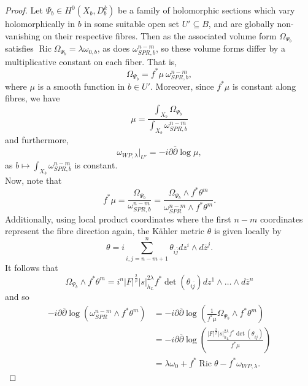 \documentclass[12pt]{article}
\numberwithin{equation}{section}
\renewcommand{\d}{\partial}
\newcommand{\dbar}{\overline{\partial}}
\DeclareMathOperator{\Ric}{Ric}
\newcommand{\oo}[1]{\overline{#1}}
\begin{document}
\begin{proof}
Let $\Psi_b \in H^0(X_b,D_b^k)$ be a family of holomorphic sections which vary holomorphically in $b$ in some suitable open set $U' \subseteq B$, and are globally non-vanishing on their respective fibres. Then as the associated volume form $\Omega_{\Psi_b}$ satisfies $\Ric \Omega_{\Psi_b} = \lambda \omega_{0,b}$, as does $\omega_{SPR,b}^{n-m}$, so these volume forms differ by a multiplicative constant on each fiber. That is, 
\begin{equation*}
    \Omega_{\Psi_b} = f^*\mu \ \omega_{SPR,b}^{n-m},
\end{equation*}
where $\mu$ is a smooth function in $b \in U'$. Moreover, since $f^*\mu$ is constant along fibres, we have 
\begin{equation*}
    \mu= \frac{\int_{X_b} \Omega_{\Psi_b}}{\int_{X_b}\omega_{SPR,b}^{n-m}}
\end{equation*}
and furthermore,
\begin{equation*}
    \omega_{WP,\lambda}|_{U'} = -i\d\dbar \log \mu,
\end{equation*}
as $b \mapsto \int_{X_b} \omega_{SPR,b}^{n-m}$ is constant.\\ 
Now, note that
\begin{equation*}
    f^*\mu = \frac{\Omega_{\Psi_b}}{\omega_{SPR,b}^{n-m}} = \frac{\Omega_{\Psi_b} \wedge f^* \theta^m}{\omega_{SPR}^{n-m} \wedge f^* \theta^m}.
\end{equation*}
Additionally, using local product coordinates where the first $n-m$ coordinates represent the fibre direction again, the K\"ahler metric $\theta$ is given locally by
\begin{equation*}
    \theta = i\sum_{i,j=n-m+1}^n \theta_{i\oo{j}} dz^i \wedge d\oo{z}^j.
\end{equation*}
It follows that
\begin{equation*}
    \Omega_{\Psi_b} \wedge f^* \theta^m = i^n |F|^{\frac{2}{\beta}} |s|^{2\lambda}_{h_{L}} f^*\det(\theta_{i\oo{j}}) dz^1 \wedge \dots \wedge d\oo{z}^n
\end{equation*}
and so
\begin{align*}
    -i\d\dbar\log (\omega_{SPR}^{n-m} \wedge f^* \theta^m) &= -i\d\dbar \log \left(\frac{1}{f^*\mu} \Omega_{\Psi_b} \wedge f^* \theta^m\right)\\
    &= -i\d\dbar\log\left(\frac{|F|^{\frac{2}{\beta}} |s|^{2\lambda}_{h_{L}} f^*\det(\theta_{i\oo{j}})}{f^*\mu}\right)\\
    &=  \lambda \omega_0 + f^* \Ric \theta - f^*\omega_{WP,\lambda}.
\end{align*}
\end{proof}
\end{document}
